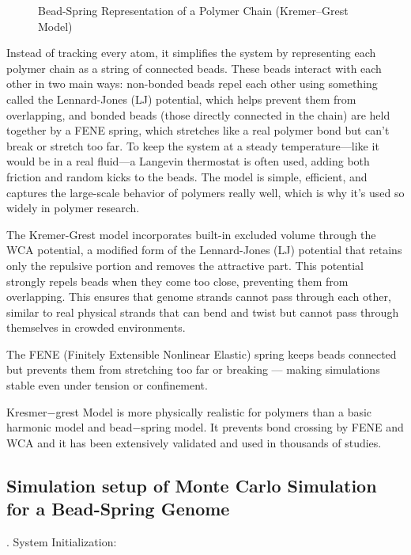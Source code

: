 \documentclass[12pt]{article}
\begin{document}
\begin{flushleft}
\begin{figure}[!ht]
  \centering
  \caption{Bead-Spring Representation of a Polymer Chain (Kremer–Grest Model)}
\end{figure}


Instead of tracking every atom, it simplifies the system by representing each polymer chain as a string of connected beads. These beads interact with each other in two main ways: non-bonded beads repel each other using something called the Lennard-Jones (LJ) potential, which helps prevent them from overlapping, and bonded beads (those directly connected in the chain) are held together by a FENE spring, which stretches like a real polymer bond but can't break or stretch too far. To keep the system at a steady temperature—like it would be in a real fluid—a Langevin thermostat is often used, adding both friction and random kicks to the beads. The model is simple, efficient, and captures the large-scale behavior of polymers really well, which is why it's used so widely in polymer research.	



The Kremer-Grest model incorporates built-in excluded volume through the WCA potential, a modified form of the Lennard-Jones (LJ) potential that retains only the repulsive portion and removes the attractive part. This potential strongly repels beads when they come too close, preventing them from overlapping. This ensures that genome strands cannot pass through each other, similar to real physical strands that can bend and twist but cannot pass through themselves in crowded environments.

The FENE (Finitely Extensible Nonlinear Elastic) spring keeps beads connected but prevents them from stretching too far or breaking — making simulations stable even under tension or confinement.
	

Kresmer$-$grest Model is more physically realistic for polymers than a basic harmonic model and bead$-$spring model.
It prevents bond crossing by FENE and WCA and it has been extensively validated and used in thousands of studies.








\vspace{-1em} 

\subsection*{Simulation setup of Monte Carlo Simulation for a Bead-Spring Genome}
. System Initialization:


\end{flushleft}
\end{document}
